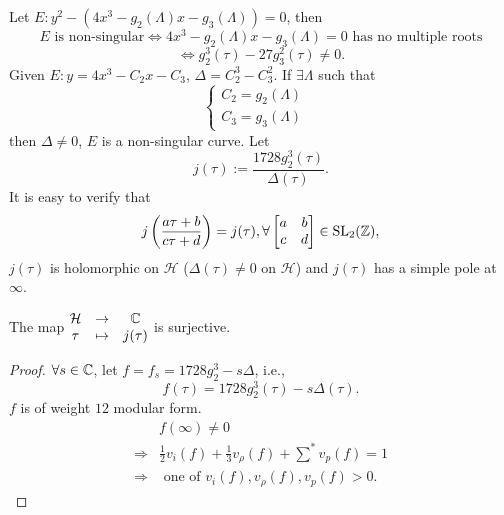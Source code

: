 Let $E:y^2-(4x^3-g_2(\Lambda)x-g_3(\Lambda))=0$, then
\[
  E \text{ is non-singular}\Leftrightarrow 4x^3-g_2(\Lambda)x-g_3(\Lambda)=0 \text{ has no multiple roots}
\] 
\[
  \Leftrightarrow g_2^3(\tau)-27g_3^2(\tau)\neq 0.
\] 
Given $E:y=4x^3-C_2x-C_3$, $\Delta=C_2^3-C_3^2$. If $\exists \Lambda$ such that 
\[
\begin{cases}
  C_2=g_2(\Lambda)&\\
  C_3=g_3(\Lambda)&
\end{cases}
\] 
then $\Delta\neq 0$, $E$ is a non-singular curve.
Let 
\begin{equation}
  j(\tau):= \frac{1728 g_2^3(\tau)}{\Delta(\tau)}
.\end{equation} 
It is easy to verify that
\[
  j\left( \frac{a\tau+b}{c\tau+d} \right) =j(\tau),\forall \begin{bmatrix} a&b\\c&d \end{bmatrix} \in \operatorname{SL}_2(\mathbb{Z}),
\] 
$j(\tau)$ is holomorphic on $\mathcal{H}$ ($\Delta(\tau)\neq 0$ on $\mathcal{H}$) and $j(\tau)$ has a simple pole at $\infty$.

\begin{lemma}\label{lma3-9}
  The map $\begin{matrix} \mathcal{H}&\to & \mathbb{C} \\ \tau & \mapsto & j(\tau) \end{matrix} $ is surjective.
\end{lemma}
\begin{proof}
  $\forall s \in \mathbb{C}$, let $f=f_s=1728g_2^3-s\Delta$, i.e.,
  \[
    f(\tau)=1728g_2^3(\tau)-s\Delta(\tau).
  \] 
  $f$ is of weight $12$ modular form.
  \begin{align*}
    &f(\infty)\neq 0\\
    \Rightarrow & \frac{1}{2}v_i(f)+\frac{1}{3}v_\rho(f)+\sum\nolimits^{*}v_p(f)=1\\
    \Rightarrow & \text{ one of }v_i(f),v_\rho(f),v_p(f)>0
  .\end{align*}
\end{proof}

